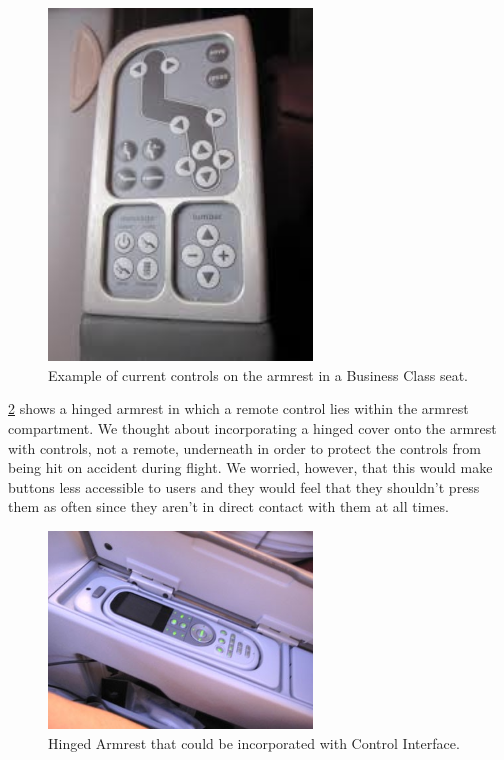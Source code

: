 \begin{figure}[h]
  \centering
     \includegraphics[width=7cm]{images/ArmrestControls2.jpg}
   \caption{Example of current controls on the armrest in a Business Class seat. \cite{armrest_controls2}}
  \label{fig:ArmrestsControls2.jpg}
\end{figure}

\ref{fig:HingedArmrest.jpg} shows a hinged armrest in which a remote control lies within the armrest compartment.  We thought about incorporating a hinged cover onto the armrest with controls, not a remote, underneath in order to protect the controls from being hit on accident during flight. We worried, however, that this would make buttons less accessible to users and they would feel that they shouldn't press them as often since they aren't in direct contact with them at all times. 

\begin{figure}[h]
  \centering
     \includegraphics[width=7cm]{images/HingedArmrest.jpg}
   \caption{Hinged Armrest that could be incorporated with Control Interface. \cite{hinged}}
  \label{fig:HingedArmrest.jpg}
\end{figure}


